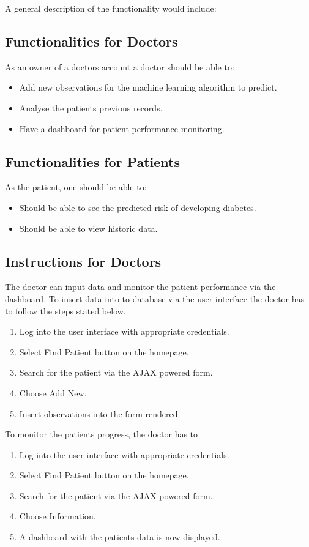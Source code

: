 \documentclass[12pt]{article}
\begin{document}
A general description of the functionality would include:
\subsection{Functionalities for Doctors}
As an owner of a doctors account a doctor should be able to:
\begin{itemize}
\item Add new observations for the machine learning algorithm to predict.
\item Analyse the patients previous records.
\item Have a dashboard for patient performance monitoring.
\end{itemize}

\subsection{Functionalities for Patients}
As the patient, one should be able to:
\begin{itemize}
\item Should be able to see the predicted risk of developing diabetes.
\item Should be able to view historic data.
\end{itemize}

\subsection{Instructions for Doctors}
The doctor can input data and monitor the patient performance via the dashboard. To insert data into to database via the user interface the doctor has to follow the steps stated below.
\begin{enumerate}
\item Log into the user interface with appropriate credentials.
\item Select Find Patient button on the homepage.
\item Search for the patient via the AJAX powered form.
\item Choose Add New.
\item Insert observations into the form rendered.
\end{enumerate}

To monitor the patients progress, the doctor has to
\begin{enumerate}
\item Log into the user interface with appropriate credentials.
\item Select Find Patient button on the homepage.
\item Search for the patient via the AJAX powered form.
\item Choose Information.
\item A dashboard with the patients data is now displayed.
\end{enumerate} 
\end{document}
